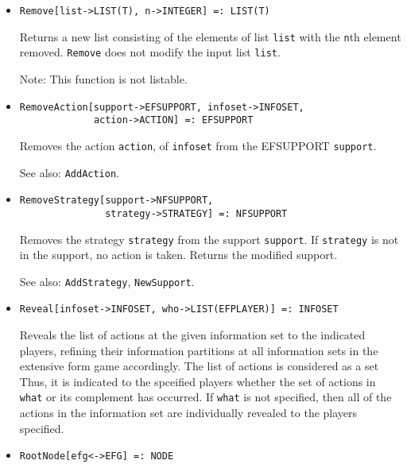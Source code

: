 \begin{itemize}
\item
\protect \large \begin{verbatim}
Remove[list->LIST(T), n->INTEGER] =: LIST(T)
\end{verbatim}\normalsize

\bd
Returns a new list consisting of the elements of list
\verb+list+ with the \verb+n+th element removed.  {\tt Remove} does not
modify the input list \verb+list+.
\item
[Note:] This function is not listable.
\ed

\item
\protect \large \begin{verbatim}
RemoveAction[support->EFSUPPORT, infoset->INFOSET, 
             action->ACTION] =: EFSUPPORT
\end{verbatim}\normalsize

\bd
Removes the action \verb+action+, of \verb+infoset+  from the 
EFSUPPORT \verb+support+.
\item
[See also:] {\tt AddAction}.
\ed

\item
\protect \large \begin{verbatim}
RemoveStrategy[support->NFSUPPORT, 
               strategy->STRATEGY] =: NFSUPPORT
\end{verbatim}\normalsize

\bd
Removes the strategy \verb+strategy+ from the
support \verb+support+.  If \verb+strategy+ is not in the support,
no action is taken.  Returns the modified support.
\item
[See also:] {\tt AddStrategy}, {\tt NewSupport}.
\ed

\item
\protect \large \begin{verbatim}
Reveal[infoset->INFOSET, who->LIST(EFPLAYER)] =: INFOSET
\end{verbatim}\normalsize

\bd
Reveals the list of actions at the given information
set to the indicated players, refining their information partitions at
all information sets in the extensive form game accordingly.  The list
of actions is considered as a set Thus, it is indicated to the
spceified players whether the set of actions in \verb+what+ or its
complement has occurred.  If \verb+what+ is not specified, then all of
the actions in the information set are individually revealed to
the players specified.  
\ed


\item
\protect \large \begin{verbatim}
RootNode[efg<->EFG] =: NODE
\end{verbatim}\normalsize


\end{itemize}
